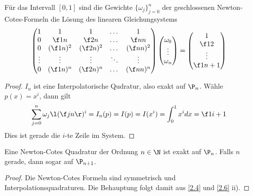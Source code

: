\documentclass[11pt]{scrbook}
\begin{document}
\begin{st}
	\label{2.10}
	Für das Intervall $[0,1]$ sind die Gewichte $\{\omega_j\}_{j=0}^n$ der geschlossenen Newton-Cotes-Formeln die Lösung des linearen Gleichungsystems
	\[
		\begin{pmatrix}
			1 & 1 & 1 & \dotsc & 1 \\
			0 & \f 1n & \f 2n & \dotsc & \f nn \\
			0 & (\f 1n)^2 & (\f 2n)^2 & \dotsc & (\f nn)^2 \\
			\vdots & \vdots & \vdots & \ddots & \vdots \\
			0 & (\f 1n)^n & (\f 2n)^n & \dotsc & (\f nn)^n \\
		\end{pmatrix}
		\begin{pmatrix}
			\omega_0 \\
			\vdots \\
			\omega_n
		\end{pmatrix}
		=
		\begin{pmatrix}
			1 \\ \f 12 \\ \vdots \\ \f 1{n+1}
		\end{pmatrix}
	\]
	\begin{proof}
		$I_n$ ist eine Interpolatorische Qudratur, also exakt auf $\P_n$.
		Wähle $p(x) = x^i$, dann gilt
		\[
			\sum_{j=0}^n \omega_j \l( \f jn \r)^i = I_n(p) = I(p) = I(x^i) = \int_0^1 x^i dx = \f 1{i+1}
		\]
		Dies ist gerade die $i$-te Zeile im System.
	\end{proof}
\end{st}

\begin{kor}
	\label{2.11}
	Eine Newton-Cotes Quadratur der Ordnung $n\in \N$ ist exakt auf $\P_n$.
	Falls $n$ gerade, dann sogar auf $\P_{n+1}$.
	\begin{proof}
		Die Newton-Cotes Formeln sind symmetrisch und Interpolationsquadraturen.
		Die Behauptung folgt damit aus \ref{2.4} und \ref{2.6} ii).
	\end{proof}
\end{kor}
\end{document}
